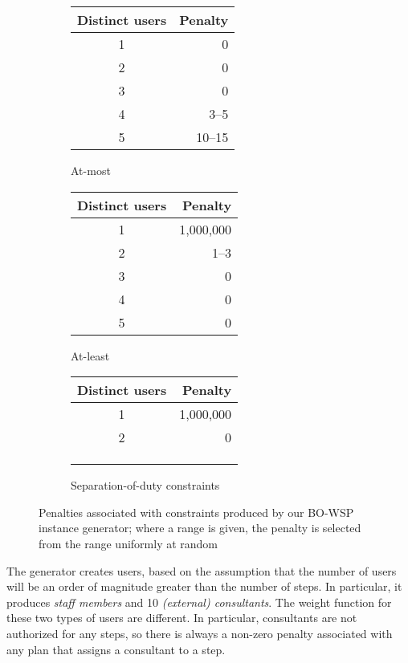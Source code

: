 \documentclass[jcs,crcready]{iosart1c}
\newcommand{\BOWSP}{\textsc{BO-WSP}\xspace}
\begin{document}
\begin{figure}[htb]
\begin{subfigure}[b]{.3\textwidth}\centering
	\begin{tabular}{@{} cr @{}}
		\toprule
 		Distinct users & Penalty \\
		\midrule
		1 & 0 \\
		2 & 0 \\
		3 & 0 \\
		4 & 3--5 \\
		5 & 10--15 \\
		\bottomrule
	\end{tabular}
\caption{At-most} 
\end{subfigure}
\hfill
\begin{subfigure}[b]{.3\textwidth}\centering
	\begin{tabular}{@{} cr @{}}
		\toprule
 		Distinct users & Penalty \\
		\midrule
		1 & 1,000,000 \\
		2 & 1--3 \\
		3 & 0 \\
		4 & 0 \\
		5 & 0 \\
		\bottomrule
	\end{tabular}
\caption{At-least}
\end{subfigure}
\hfill
\begin{subfigure}[b]{.3\textwidth}\centering
	\begin{tabular}{@{} cr @{}}
		\toprule
 		Distinct users & Penalty \\
		\midrule
		1 & 1,000,000 \\
		2 & 0 \\
		\\
		\\
		\\
		\bottomrule
	\end{tabular}
 \caption{Separation-of-duty constraints} 
\end{subfigure}
 \caption{Penalties associated with constraints produced by our \BOWSP instance generator; where a range is given, the penalty is selected from the range uniformly at random}\label{fig:constraint-penalties}
\end{figure} 


 The generator creates  users, based on the assumption that the number of users will be an order of magnitude greater than the number of steps.
 In particular, it produces  \emph{staff members} and 10 \emph{(external) consultants}.
 The weight function for these two types of users are different.
 In particular, consultants are not authorized for any steps, so there is always a non-zero penalty associated with any plan that assigns a consultant to a step.
\end{document}

